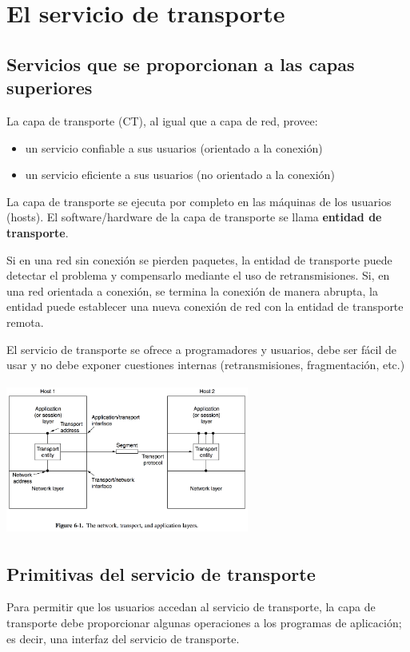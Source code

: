 \documentclass[10pt,a4paper]{report}
\begin{document}
\section{El servicio de transporte}
\subsection{Servicios que se proporcionan a las capas superiores}
\par La capa de transporte (CT), al igual que a capa de red, provee:
	\begin{itemize}
		\item un servicio confiable a sus usuarios (orientado a la conexión)
		\item un servicio eficiente a sus usuarios (no orientado a la conexión)
	\end{itemize}
	
\par La capa de transporte se ejecuta por completo en las máquinas de los usuarios 
(hosts). El software/hardware de la capa de transporte se llama \textbf{entidad de 
transporte}.

\par Si en una red sin conexión se pierden paquetes, la entidad de transporte puede 
detectar el problema y compensarlo mediante el uso de retransmisiones. Si, en una 
red orientada a conexión, se termina la conexión de manera abrupta, la entidad puede 
establecer una nueva conexión de red con la entidad de transporte remota.
\par El servicio de transporte se ofrece a programadores y usuarios, debe ser fácil de 
usar y no debe exponer cuestiones internas (retransmisiones, fragmentación, etc.)

	\begin{center}
	\includegraphics[width=8cm, height=5cm]{./imagenes/transporte.png} 
	\end{center}

\subsection{Primitivas del servicio de transporte}
\par Para permitir que los usuarios accedan al servicio de transporte, la capa de 
transporte debe proporcionar algunas operaciones a los programas de aplicación; es 
decir, una interfaz del servicio de transporte.
\end{document}
